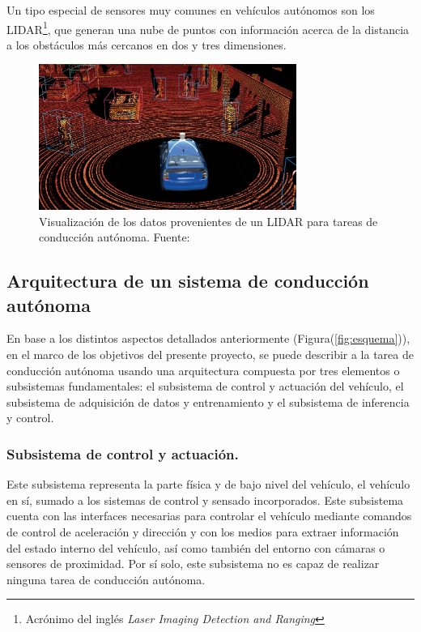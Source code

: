         Un tipo especial de sensores muy comunes en vehículos autónomos son los LIDAR\footnote{Acrónimo del inglés \textit{Laser Imaging Detection and Ranging}}, que generan una nube de puntos 
        con información acerca de la distancia a los obstáculos más cercanos en dos y tres dimensiones.
        \begin{figure}[!h] 
            \centering
            \includegraphics[width=0.75\textwidth]{img/lidar}
            \caption[Visualización de los datos provenientes de un LIDAR]{Visualización de los datos provenientes de un LIDAR para tareas de conducción autónoma. Fuente: \cite{cameron_2017} }
            \label{fig:lidar}
        \end{figure}
        

    \subsection{Arquitectura de un sistema de conducción autónoma}
    En base a los distintos aspectos detallados anteriormente (Figura(\ref{fig:esquema})), en el marco de los objetivos del presente 
    proyecto, se puede describir a la tarea de conducción autónoma usando una arquitectura compuesta 
    por tres elementos o subsistemas fundamentales: el subsistema de control y actuación del vehículo, el 
    subsistema de adquisición de datos y entrenamiento y el subsistema de inferencia y control.

        \subsubsection{Subsistema de control y actuación.}
        Este subsistema representa la parte física y de bajo nivel del vehículo, el vehículo en sí, 
        sumado a los sistemas de control y sensado incorporados. Este subsistema cuenta con las interfaces necesarias 
        para controlar el vehículo mediante comandos de control de aceleración y dirección y con los medios 
        para extraer información del estado interno del vehículo, así como también del entorno con cámaras o sensores 
        de proximidad. Por sí solo, este subsistema no es capaz de realizar ninguna tarea de conducción autónoma.

